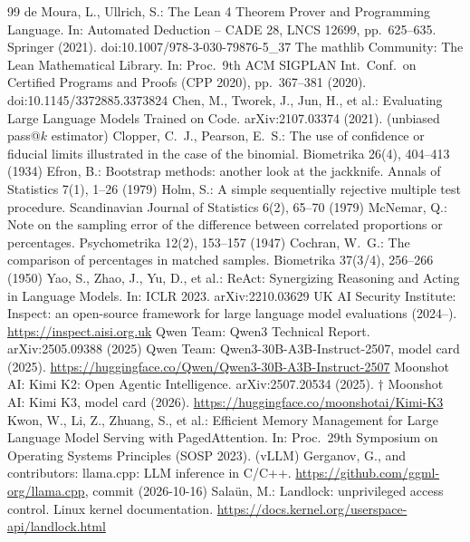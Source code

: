 \documentclass[11pt,a4paper]{article}
\begin{document}
\begin{thebibliography}{99}
\small
{} de Moura, L., Ullrich, S.: The Lean 4 Theorem Prover and Programming Language. In: Automated Deduction -- CADE 28, LNCS 12699, pp.~625--635. Springer (2021). doi:10.1007/978-3-030-79876-5\_37
 The mathlib Community: The Lean Mathematical Library. In: Proc.\ 9th ACM SIGPLAN Int.\ Conf.\ on Certified Programs and Proofs (CPP 2020), pp.~367--381 (2020). doi:10.1145/3372885.3373824
 Chen, M., Tworek, J., Jun, H., et al.: Evaluating Large Language Models Trained on Code. arXiv:2107.03374 (2021). (unbiased pass@$k$ estimator)
 Clopper, C.~J., Pearson, E.~S.: The use of confidence or fiducial limits illustrated in the case of the binomial. Biometrika 26(4), 404--413 (1934)
 Efron, B.: Bootstrap methods: another look at the jackknife. Annals of Statistics 7(1), 1--26 (1979)
 Holm, S.: A simple sequentially rejective multiple test procedure. Scandinavian Journal of Statistics 6(2), 65--70 (1979)
 McNemar, Q.: Note on the sampling error of the difference between correlated proportions or percentages. Psychometrika 12(2), 153--157 (1947)
 Cochran, W.~G.: The comparison of percentages in matched samples. Biometrika 37(3/4), 256--266 (1950)
 Yao, S., Zhao, J., Yu, D., et al.: ReAct: Synergizing Reasoning and Acting in Language Models. In: ICLR 2023. arXiv:2210.03629
 UK AI Security Institute: Inspect: an open-source framework for large language model evaluations (2024--). \url{https://inspect.aisi.org.uk}
 Qwen Team: Qwen3 Technical Report. arXiv:2505.09388 (2025)
 Qwen Team: Qwen3-30B-A3B-Instruct-2507, model card (2025). \url{https://huggingface.co/Qwen/Qwen3-30B-A3B-Instruct-2507}
 Moonshot AI: Kimi K2: Open Agentic Intelligence. arXiv:2507.20534 (2025). $\dagger$
 Moonshot AI: Kimi K3, model card (2026). \url{https://huggingface.co/moonshotai/Kimi-K3}
 Kwon, W., Li, Z., Zhuang, S., et al.: Efficient Memory Management for Large Language Model Serving with PagedAttention. In: Proc.\ 29th Symposium on Operating Systems Principles (SOSP 2023). (vLLM)
 Gerganov, G., and contributors: llama.cpp: LLM inference in C/C++. \url{https://github.com/ggml-org/llama.cpp}, commit  (2026-10-16)
 Sala\"un, M.: Landlock: unprivileged access control. Linux kernel documentation. \url{https://docs.kernel.org/userspace-api/landlock.html}

\end{thebibliography}
\end{document}
